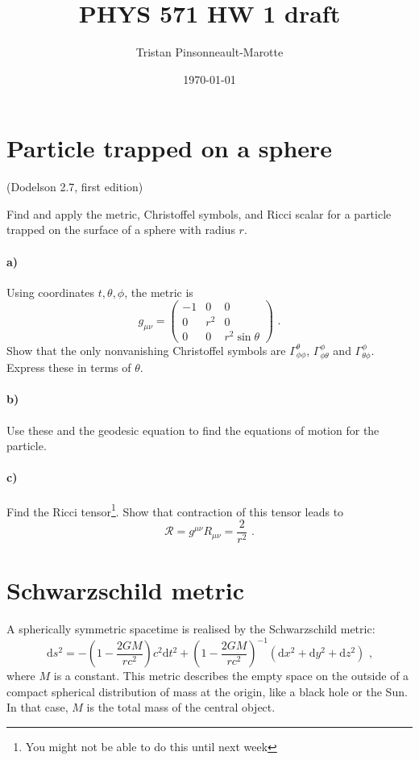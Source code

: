 \documentclass[12pt]{article}
\author{Tristan Pinsonneault-Marotte}
\title{PHYS 571 HW 1 draft}
\date{\today}
\newcommand\diff{\mathrm{d}}
\begin{document}
\maketitle

\section{Particle trapped on a sphere}
(Dodelson 2.7, first edition)

Find and apply the metric, Christoffel symbols, and Ricci scalar for a particle
trapped on the surface of a sphere with radius $r$.

\paragraph{a)} Using coordinates $t, \theta, \phi$, the metric is
\begin{equation}
    g_{\mu\nu} = \begin{pmatrix}
        -1 & 0 & 0 \\
        0 & r^2 & 0 \\
        0 & 0 & r^2 \sin\theta
    \end{pmatrix}
    \text{ .}
\end{equation}
Show that the only nonvanishing Christoffel symbols are
$\Gamma^\theta_{\phi\phi}$, $\Gamma^\phi_{\phi\theta}$ and
$\Gamma^\phi_{\theta\phi}$. Express these in terms of $\theta$.

\paragraph{b)} Use these and the geodesic equation to find the equations of
motion for the particle.

\paragraph{c)} Find the Ricci tensor\footnote{You might not be able to do this until next week}. Show that contraction of this tensor leads
to
\begin{equation}
    \mathcal{R} = g^{\mu\nu} R_{\mu\nu} = \frac{2}{r^2} \text{ .}
\end{equation}

\section{Schwarzschild metric}

A spherically symmetric spacetime is realised by the Schwarzschild metric:
\begin{equation}
    \diff s^2 = - \left(1 - \frac{2 G M}{r c^2}\right) c^2 \diff t^2
    + \left(1 - \frac{2 G M}{r c^2}\right)^{-1}
    (\diff x^2 + \diff y^2 + \diff z^2) \text{ ,}
\end{equation}
where $M$ is a constant. This metric describes the empty space on the outside of
a compact spherical distribution of mass at the origin, like a black hole or the
Sun. In that case, $M$ is the total mass of the central object.
\end{document}
